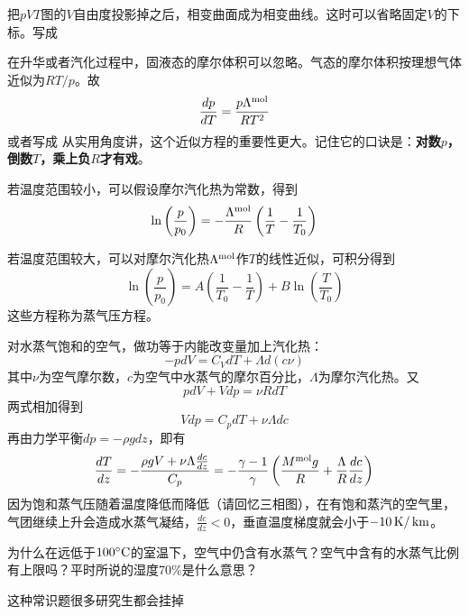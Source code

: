 \documentclass[CJK]{beamer}
\begin{document}
\begin{frame}
  \bch
  \emini
  把$pVT$图的$V$自由度投影掉之后，相变曲面成为相变曲线。这时可以省略固定$V$的下标。写成
  \emini

  \ech
\end{frame}


\begin{frame}
  \bch
  在升华或者汽化过程中，固液态的摩尔体积可以忽略。气态的摩尔体积按理想气体近似为$RT/p$。故
  $$ \frac{dp}{dT} = \frac{p\Lambda^{\rm mol}}{RT^2}$$
  或者写成
  从实用角度讲，这个近似方程的重要性更大。记住它的口诀是：{\bf 对数$p$，倒数$T$，乘上负$R$才有戏}。
  \ech
\end{frame}


\begin{frame}
  \bch
  \bitem
  \item{
  若温度范围较小，可以假设摩尔汽化热为常数，得到
  $$\ln\left(\frac{p}{p_0}\right) = -\frac{\Lambda^{\rm mol}}{R}\left(\frac{1}{T}-\frac{1}{T_0}\right)$$
  }
  \item{若温度范围较大，可以对摩尔汽化热$\Lambda^{\rm mol}$作$T$的线性近似，可积分得到
    $$\ln\left(\frac{p}{p_0}\right) = A \left(\frac{1}{T_0} - \frac{1}{T}\right) + B \ln\left(\frac{T}{T_0}\right)$$}
    \eitem
  这些方程称为蒸气压方程。
  \ech
\end{frame}

\begin{frame}
\bch
{\small
对水蒸气饱和的空气，做功等于内能改变量加上汽化热：
$$ -pdV = C_V dT + \Lambda d(c\nu) $$
其中$\nu$为空气摩尔数，$c$为空气中水蒸气的摩尔百分比，$\Lambda$为摩尔汽化热。又
$$pdV + Vdp = \nu R dT$$
两式相加得到
$$ Vdp = C_p  dT + \nu \Lambda dc $$
再由力学平衡$ dp = -\rho g dz$，即有
$$ \frac{dT}{dz} =-\frac{\rho g V + \nu\Lambda\frac{dc}{dz}}{C_p} = -\frac{\gamma-1}{\gamma}\left(\frac{M^{\rm mol}g}{R}+\frac{\Lambda}{R}\frac{dc}{dz}\right)$$
因为饱和蒸气压随着温度降低而降低（请回忆三相图），在有饱和蒸汽的空气里，气团继续上升会造成水蒸气凝结，$ \frac{dc}{dz} < 0 $，垂直温度梯度就会小于$-10\,\mathrm{K}/\,\mathrm{km}$。
}
\ech
\end{frame}


\begin{frame}
  \chtitle{\proid (\stwo)}
  \bch
  为什么在远低于$100^\circ \mathrm{C}$的室温下，空气中仍含有水蒸气？空气中含有的水蒸气比例有上限吗？平时所说的湿度70\%是什么意思？

  \skiplines

  \skiplines
  
  {\small 这种常识题很多研究生都会挂掉\huaixiao}
  
  \ech
\end{frame}
\end{document}
